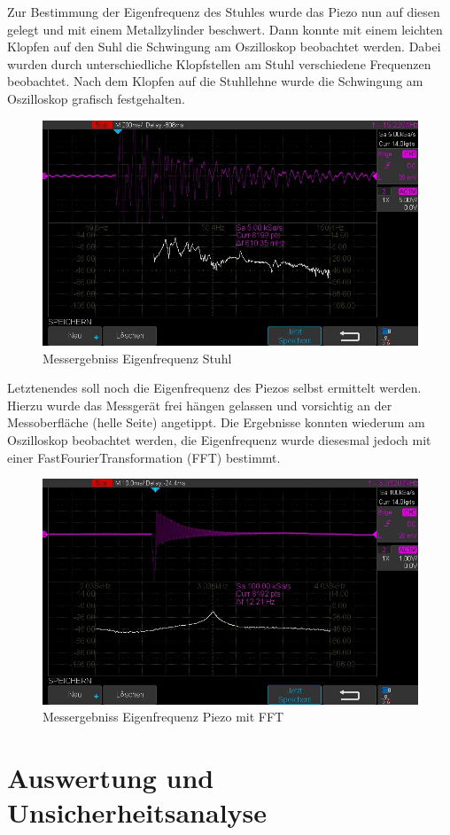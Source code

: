 \documentclass[12pt,a4paper,twoside]{article}
\begin{document}
\noindent
Zur Bestimmung der Eigenfrequenz des Stuhles wurde das Piezo nun auf diesen gelegt und mit einem Metallzylinder beschwert. Dann konnte mit einem leichten Klopfen auf den Suhl die Schwingung am Oszilloskop beobachtet werden. 
Dabei wurden durch unterschiedliche Klopfstellen am Stuhl verschiedene Frequenzen beobachtet. Nach dem Klopfen auf die Stuhllehne wurde die Schwingung am Oszilloskop grafisch festgehalten.

\begin{figure}[H]
    \centering
    \includegraphics[width=0.6\linewidth, angle=0]{Messergebnisse/3.4EigenfrequenzStuhl/EigenfrequenzStuhl.jpg}
    \caption{Messergebniss Eigenfrequenz Stuhl}
    \label{fig:MessergebnissEigenfrequenzStuhl}
\end{figure}

\noindent
Letztenendes soll noch die Eigenfrequenz des Piezos selbst ermittelt werden. Hierzu wurde das Messgerät frei hängen gelassen und vorsichtig an der Messoberfläche (helle Seite) angetippt.
Die Ergebnisse konnten wiederum am Oszilloskop beobachtet werden, die Eigenfrequenz wurde diesesmal jedoch mit einer FastFourierTransformation (FFT) bestimmt.

\begin{figure}[H]
    \centering
    \includegraphics[width=0.6\linewidth, angle=0]{Messergebnisse/3.4 EigenfrequenzDing/DSO00001.jpg}
    \caption{Messergebniss Eigenfrequenz Piezo mit FFT}
    \label{fig:MessergebnissEigenfrequenzPiezo}
\end{figure}


\section{Auswertung und Unsicherheitsanalyse} %
\end{document}
